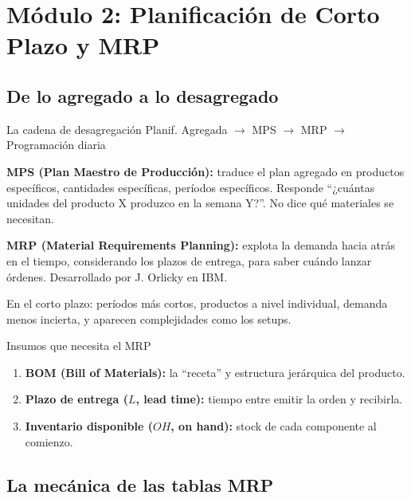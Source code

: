 \section{Módulo 2: Planificación de Corto Plazo y MRP}

\subsection{De lo agregado a lo desagregado}

\begin{definicion}{La cadena de desagregación}
   Planif. Agregada $\rightarrow$ MPS $\rightarrow$ MRP $\rightarrow$ Programación diaria

   \textbf{MPS (Plan Maestro de Producción):} traduce el plan agregado en productos específicos, cantidades específicas, períodos específicos. Responde ``¿cuántas unidades del producto X produzco en la semana Y?''. No dice qué materiales se necesitan.
   
   \textbf{MRP (Material Requirements Planning):} explota la demanda hacia atrás en el tiempo, considerando los plazos de entrega, para saber cuándo lanzar órdenes. Desarrollado por J. Orlicky en IBM.

   En el corto plazo: períodos más cortos, productos a nivel individual, demanda menos incierta, y aparecen complejidades como los setups.
\end{definicion}

\begin{definicion}{Insumos que necesita el MRP}
\begin{enumerate}
  \item \textbf{BOM (Bill of Materials):} la ``receta'' y estructura jerárquica del producto.
  \item \textbf{Plazo de entrega ($L$, lead time):} tiempo entre emitir la orden y recibirla.
  \item \textbf{Inventario disponible ($OH$, on hand):} stock de cada componente al comienzo.
\end{enumerate}
\end{definicion}

\subsection{La mecánica de las tablas MRP}


